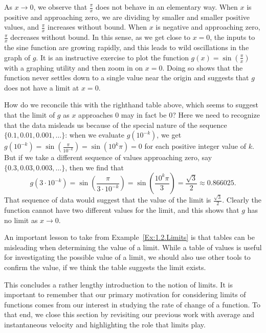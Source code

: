 As $x \to 0$, we observe that $\frac{\pi}{x}$ does not behave in an elementary way.  When $x$ is positive and approaching zero, we are dividing by smaller and smaller positive values, and $\frac{\pi}{x}$ increases without bound.  When $x$ is negative and approaching zero, $\frac{\pi}{x}$ decreases without bound.  In this sense, as we get close to $x = 0$, the inputs to the sine function are growing rapidly, and this leads to wild oscillations in the graph of $g$.  It is an instructive exercise to plot the function $g(x) = \sin\left(\frac{\pi}{x}\right)$ with a graphing utility and then zoom in on $x = 0$.  Doing so shows that the function never settles down to a single value near the origin and suggests that $g$ does not have a limit at $x = 0$.

How do we reconcile this with the righthand table above, which seems to suggest that the limit of $g$ as $x$ approaches $0$ may in fact be $0$?  Here we need to recognize that the data misleads us because of the special nature of the sequence $\{0.1, 0.01, 0.001, \ldots\}$: when we evaluate $g(10^{-k})$, we get $g(10^{-k}) = \sin\left(\frac{\pi}{10^{-k}}\right) = \sin(10^k \pi) = 0$ for each positive integer value of $k$.  But if we take a different sequence of values approaching zero, say $\{0.3, 0.03, 0.003, \ldots\}$, then we find that 
$$g(3 \cdot 10^{-k}) = \sin\left(\frac{\pi}{3 \cdot 10^{-k}}\right) = \sin\left(\frac{10^k \pi}{3}\right) = \frac{\sqrt{3}}{2} \approx 0.866025.$$
That sequence of data would suggest that the value of the limit is $\frac{\sqrt{3}}{2}$.  Clearly the function cannot have two different values for the limit, and this shows that $g$ has no limit as $x \to 0$.
\afterex

An important lesson to take from Example~\ref{Ex:1.2.Limits} is that tables can be misleading when determining the value of a limit.  While a table of values is useful for investigating the possible value of a limit, we should also use other tools to confirm the value, if we think the table suggests the limit exists.




This concludes a rather lengthy introduction to the notion of limits.  It is important to remember that our primary motivation for considering limits of functions comes from our interest in studying the rate of change of a function.  To that end, we close this section by revisiting our previous work with average and instantaneous velocity and highlighting the role that limits play. 

